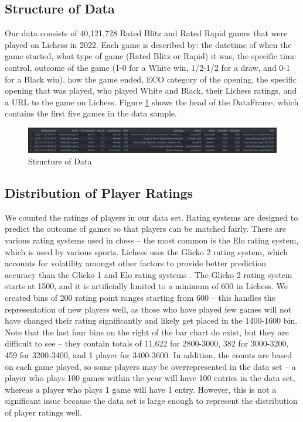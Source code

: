 \documentclass[a4paper, 11pt]{article}
\begin{document}
\subsection{Structure of Data}
Our data consists of 40,121,728 Rated Blitz and Rated Rapid games that were played on Lichess in 2022. Each game is described by: the datetime of when the game started, what type of game (Rated Blitz or Rapid) it was, the specific time control, outcome of the game (1-0 for a White win, 1/2-1/2 for a draw, and 0-1 for a Black win), how the game ended, ECO category of the opening, the specific opening that was played, who played White and Black, their Lichess ratings, and a URL to the game on Lichess. Figure \ref{fig:structureOfData} shows the head of the DataFrame, which contains the first five games in the data sample.

\begin{figure}[H]
    \centering
    \caption{Structure of Data}
    \label{fig:structureOfData}
    \includegraphics[width=\textwidth]{Structure of Data.png}
\end{figure}

\subsection{Distribution of Player Ratings}
We counted the ratings of players in our data set. Rating systems are designed to predict the outcome of games so that players can be matched fairly. There are various rating systems used in chess -- the most common is the Elo rating system, which is used by various sports. Lichess uses the Glicko 2 rating system, which accounts for volatility amongst other factors to provide better prediction accuracy than the Glicko 1 and Elo rating systems \cite{chessRatingSystems, DeloitteFIDEChessRatingChallenge}. The Glicko 2 rating system starts at 1500, and it is artificially limited to a minimum of 600 in Lichess. We created bins of 200 rating point ranges starting from 600 -- this handles the representation of new players well, as those who have played few games will not have changed their rating significantly and likely get placed in the 1400-1600 bin. Note that the last four bins on the right of the bar chart do exist, but they are difficult to see -- they contain totals of 11,622 for 2800-3000, 382 for 3000-3200, 459 for 3200-3400, and 1 player for 3400-3600. In addition, the counts are based on each game played, so some players may be overrepresented in the data set -- a player who plays 100 games within the year will have 100 entries in the data set, whereas a player who plays 1 game will have 1 entry. However, this is not a significant issue because the data set is large enough to represent the distribution of player ratings well.
\end{document}
